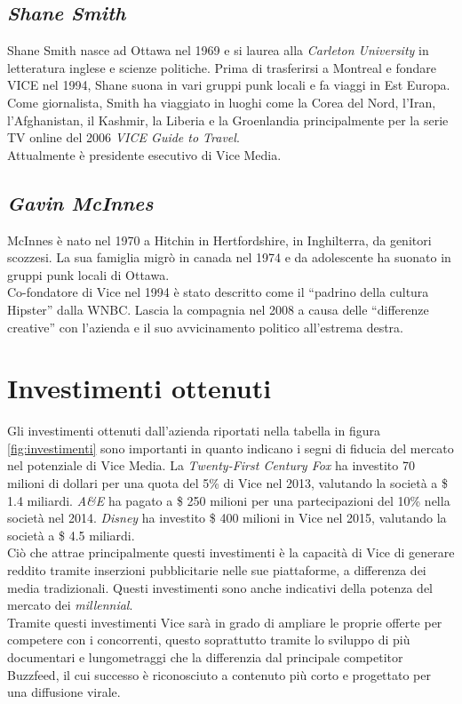 \documentclass[a4paper, 11pt]{article}
\begin{document}
\subsection*{\textit{Shane Smith}}
Shane Smith nasce ad Ottawa nel 1969 e si laurea alla \textit{Carleton University} in letteratura inglese e scienze politiche.
Prima di trasferirsi a Montreal e fondare VICE nel 1994, Shane suona in vari gruppi punk locali e fa viaggi in Est Europa.
Come giornalista, Smith ha viaggiato in luoghi come la Corea del Nord, l'Iran, l'Afghanistan, il Kashmir, la Liberia e la Groenlandia principalmente per la serie TV online del 2006 \textit{VICE Guide to Travel}.\\
Attualmente è presidente esecutivo di Vice Media.

\subsection*{\textit{Gavin McInnes}}
McInnes è nato nel 1970 a Hitchin in Hertfordshire, in Inghilterra, da genitori scozzesi. La sua famiglia migrò in canada nel 1974 e da adolescente ha suonato in gruppi punk locali di Ottawa.\\
Co-fondatore di Vice nel 1994 è stato descritto come il “padrino della cultura Hipster” dalla WNBC. 
Lascia la compagnia nel 2008 a causa delle “differenze creative” con l’azienda e il suo avvicinamento politico all’estrema destra.

\section*{Investimenti ottenuti}
\par Gli investimenti ottenuti dall’azienda riportati nella tabella in figura \ref{fig:investimenti} sono importanti in quanto indicano i segni di fiducia del mercato nel potenziale di Vice Media. La \textit{Twenty-First Century Fox} ha investito 70 milioni di dollari per una quota del 5\% di Vice nel 2013, valutando la società a \$ 1.4 miliardi.
\textit{A\&E} ha pagato a \$ 250 milioni per una partecipazioni del 10\% nella società nel 2014.
\textit{Disney} ha investito \$ 400 milioni in Vice nel 2015, valutando la società a \$ 4.5 miliardi.\\
Ciò che attrae principalmente questi investimenti è la capacità di Vice di generare reddito tramite inserzioni pubblicitarie nelle sue piattaforme, a differenza dei media tradizionali.
Questi investimenti sono anche indicativi della potenza del mercato dei \textit{millennial}.\\
Tramite questi investimenti Vice sarà in grado di ampliare le proprie offerte per competere con i concorrenti, questo soprattutto tramite lo sviluppo di più documentari e lungometraggi che la differenzia dal principale competitor Buzzfeed, il cui successo è riconosciuto a contenuto più corto e progettato per una diffusione virale.
\end{document}
